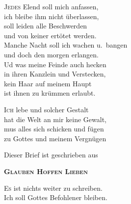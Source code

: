 \documentclass[
  paper=a3,
  fontsize=20pt,
  parskip=half,
  twocolumn,
  DIV=16,
]{scrartcl}
\newcommand{\initial}[3][initialcolor]{%
  \lettrine[
    lhang=0.5,
    lines=2,
    findent=1pt,
    lraise=0.6,
    depth=-1
  ]{\color{#1}\initials#2}{#3}
}
\newcommand{\glaubenhoffenlieben}{%
  \centerline{Dieser Brief ist geschrieben aus}
  \centerline{\serif \textbf{\textsc{Glauben Hoffen Lieben}}}%
}
\begin{document}
\initial{J}{edes} Elend soll mich anfassen, \\
ich bleibe ihm nicht überlassen, \\
soll leiden alle Beschwerden \\
und von keiner ertötet werden. \\
Manche Nacht  soll ich wachen u.\ bangen \\
und doch den morgen erlangen. \\
Ud was meine Feinde auch hecken  \\
in ihren Kanzlein und Verstecken, \\
kein Haar auf meinem Haupt \\
ist ihnen zu krümmen erlaubt.

\initial{I}{ch} lebe und solcher Gestalt \\
hat die Welt an mir keine Gewalt, \\
mus alles sich schicken und fügen \\
zu Gottes und meinem Vergnügen \\

\glaubenhoffenlieben
\vspace{-0.5em}

\initial{E}{s} ist nichts weiter zu schreiben. \\
Ich soll Gottes Befohlener bleiben.
\end{document}
